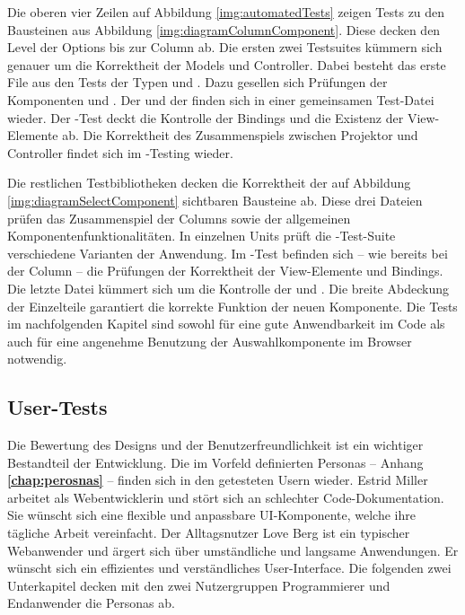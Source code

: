 Die oberen vier Zeilen auf Abbildung \ref{img:automatedTests} zeigen Tests zu den Bausteinen aus Abbildung \ref{img:diagramColumnComponent}. 
Diese decken den Level der Options bis zur Column ab. 
Die ersten zwei Testsuites kümmern sich genauer um die Korrektheit der Models und Controller. 
Dabei besteht das erste File aus den Tests der Typen  und . 
Dazu gesellen sich Prüfungen der Komponenten  und . 
Der  und der  finden sich in einer gemeinsamen Test-Datei wieder. 
Der -Test deckt die Kontrolle der Bindings und die Existenz der View-Elemente ab. 
Die Korrektheit des Zusammenspiels zwischen Projektor und Controller findet sich im -Testing wieder. 

Die restlichen Testbibliotheken decken die Korrektheit der auf Abbildung \ref{img:diagramSelectComponent} sichtbaren Bausteine ab. 
Diese drei Dateien prüfen das Zusammenspiel der Columns sowie der allgemeinen Komponentenfunktionalitäten. 
In einzelnen Units prüft die -Test-Suite verschiedene Varianten der Anwendung. 
Im -Test befinden sich – wie bereits bei der Column – die Prüfungen der Korrektheit der View-Elemente und Bindings. 
Die letzte Datei kümmert sich um die Kontrolle der  und . 
Die breite Abdeckung der Einzelteile garantiert die korrekte Funktion der neuen Komponente. 
Die Tests im nachfolgenden Kapitel sind sowohl für eine gute Anwendbarkeit im Code als auch für eine angenehme Benutzung der Auswahlkomponente im Browser notwendig. 


\subsection{User-Tests}
\label{sec:userTests}

Die Bewertung des Designs und der Benutzerfreundlichkeit ist ein wichtiger Bestandteil der Entwicklung. 
Die im Vorfeld definierten Personas – Anhang \textbf{\ref{chap:perosnas}} – finden sich in den getesteten Usern wieder. 
Estrid Miller arbeitet als Webentwicklerin und stört sich an schlechter Code-Dokumentation. 
Sie wünscht sich eine flexible und anpassbare UI-Komponente, welche ihre tägliche Arbeit vereinfacht. 
Der Alltagsnutzer Love Berg ist ein typischer Webanwender und ärgert sich über umständliche und langsame Anwendungen. 
Er wünscht sich ein effizientes und verständliches User-Interface. 
Die folgenden zwei Unterkapitel decken mit den zwei Nutzergruppen Programmierer und Endanwender die Personas ab. 


